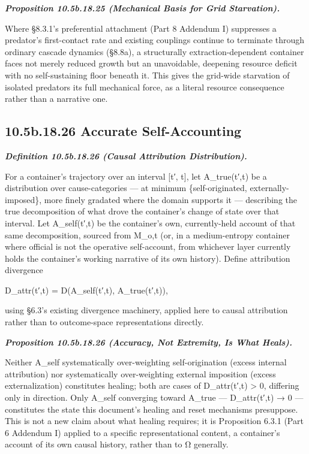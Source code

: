 \documentclass[
]{article}
\begin{document}
\emph{\textbf{Proposition 10.5b.18.25 (Mechanical Basis for Grid
Starvation).}}

Where §8.3.1's preferential attachment (Part 8 Addendum I) suppresses a
predator's first-contact rate and existing couplings continue to
terminate through ordinary cascade dynamics (§8.8a), a structurally
extraction-dependent container faces not merely reduced growth but an
unavoidable, deepening resource deficit with no self-sustaining floor
beneath it. This gives the grid-wide starvation of isolated predators
its full mechanical force, as a literal resource consequence rather than
a narrative one.

\hypertarget{b.18.26-accurate-self-accounting}{%
\subsection{10.5b.18.26 Accurate
Self-Accounting}\label{b.18.26-accurate-self-accounting}}

\emph{\textbf{Definition 10.5b.18.26 (Causal Attribution
Distribution).}}

For a container's trajectory over an interval {[}t′, t{]}, let
A\_true(t′,t) be a distribution over cause-categories --- at minimum
\{self-originated, externally-imposed\}, more finely gradated where the
domain supports it --- describing the true decomposition of what drove
the container's change of state over that interval. Let A\_self(t′,t) be
the container's own, currently-held account of that same decomposition,
sourced from M\_o,t (or, in a medium-entropy container where official is
not the operative self-account, from whichever layer currently holds the
container's working narrative of its own history). Define attribution
divergence

D\_attr(t′,t) = D(A\_self(t′,t), A\_true(t′,t)),

using §6.3's existing divergence machinery, applied here to causal
attribution rather than to outcome-space representations directly.

\emph{\textbf{Proposition 10.5b.18.26 (Accuracy, Not Extremity, Is What
Heals).}}

Neither A\_self systematically over-weighting self-origination (excess
internal attribution) nor systematically over-weighting external
imposition (excess externalization) constitutes healing; both are cases
of D\_attr(t′,t) \textgreater{} 0, differing only in direction. Only
A\_self converging toward A\_true --- D\_attr(t′,t) → 0 --- constitutes
the state this document's healing and reset mechanisms presuppose. This
is not a new claim about what healing requires; it is Proposition 6.3.1
(Part 6 Addendum I) applied to a specific representational content, a
container's account of its own causal history, rather than to Ω
generally.
\end{document}
